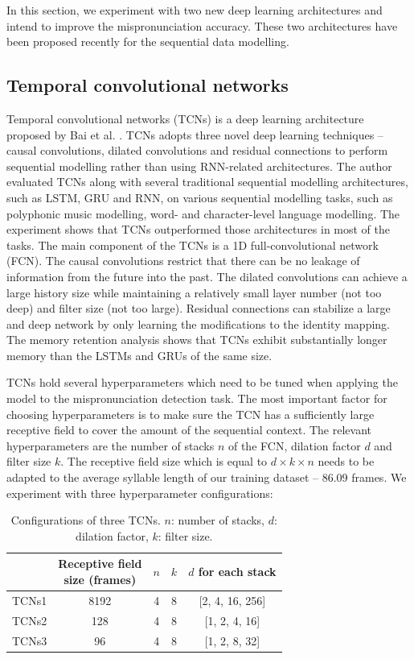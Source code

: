 In this section, we experiment with two new deep learning architectures and intend to improve the mispronunciation accuracy. These two architectures have been proposed recently for the sequential data modelling.

\subsection{Temporal convolutional networks}

Temporal convolutional networks (TCNs) is a deep learning architecture proposed by Bai et al. \cite{Bai2018}. TCNs adopts three novel deep learning techniques -- causal convolutions, dilated convolutions and residual connections to perform sequential modelling rather than using RNN-related architectures. The author evaluated TCNs along with several traditional sequential modelling architectures, such as LSTM, GRU and RNN, on various sequential modelling tasks, such as polyphonic music modelling, word- and character-level language modelling. The experiment shows that TCNs outperformed those architectures in most of the tasks. The main component of the TCNs is a 1D full-convolutional network (FCN). The causal convolutions restrict that there can be no leakage of information from the future into the past. The dilated convolutions can achieve a large history size while maintaining a relatively small layer number (not too deep) and filter size (not too large). Residual connections can stabilize a large and deep network by only learning the modifications to the identity mapping. The memory retention analysis shows that TCNs exhibit substantially longer memory than the LSTMs and GRUs of the same size.

TCNs hold several hyperparameters which need to be tuned when applying the model to the mispronunciation detection task. The most important factor for choosing hyperparameters is to make sure the TCN has a sufficiently large receptive field to cover the amount of the sequential context. The relevant hyperparameters are the number of stacks $n$ of the FCN, dilation factor $d$ and filter size $k$. The receptive field size which is equal to $d\times k \times n$ needs to be adapted to the average syllable length of our training dataset -- 86.09 frames. We experiment with three hyperparameter configurations:

\begin{table}[ht!]
\centering
\caption{Configurations of three TCNs. $n$: number of stacks, $d$: dilation factor, $k$: filter size.}
\label{tab:ch6:tcns_configurations}
\begin{tabular}{ccccc}
\toprule
& \makecell[c]{Receptive field\\size (frames)} & $n$ & $k$ & $d$ for each stack \\
\midrule
TCNs1 & 8192 & 4 & 8 & [2, 4, 16, 256] \\
TCNs2 & 128 & 4 & 8 & [1, 2, 4, 16] \\
TCNs3 & 96 & 4 & 8 & [1, 2, 8, 32] \\
\bottomrule
\end{tabular}
\end{table}

